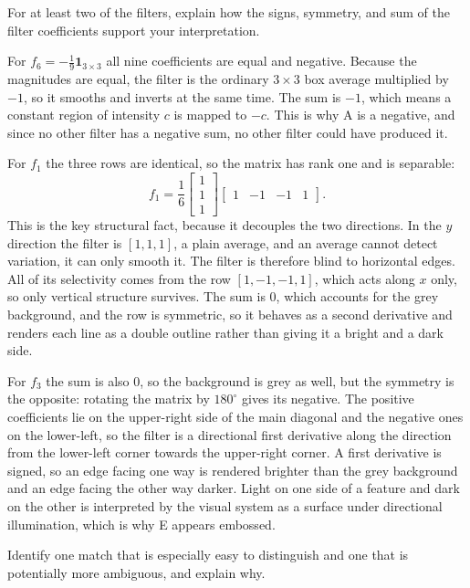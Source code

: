 \documentclass[11pt]{article}
\begin{document}
\begin{question}
For at least two of the filters, explain how the signs, symmetry, and sum of
the filter coefficients support your interpretation.
\end{question}

For $f_6 = -\tfrac{1}{9}\mathbf{1}_{3\times3}$ all nine coefficients are equal
and negative. Because the magnitudes are equal, the filter is the ordinary
$3\times3$ box average multiplied by $-1$, so it smooths and inverts at the
same time. The sum is $-1$, which means a constant region of intensity $c$ is
mapped to $-c$. This is why A is a negative, and since no other filter has a
negative sum, no other filter could have produced it.

For $f_1$ the three rows are identical, so the matrix has rank one and is
separable:
\[
    f_1 = \frac{1}{6}
    \begin{bmatrix} 1 \\ 1 \\ 1 \end{bmatrix}
    \begin{bmatrix} 1 & -1 & -1 & 1 \end{bmatrix} .
\]
This is the key structural fact, because it decouples the two directions. In
the $y$ direction the filter is $[1,1,1]$, a plain average, and an average
cannot detect variation, it can only smooth it. The filter is therefore blind
to horizontal edges. All of its selectivity comes from the row
$[1,-1,-1,1]$, which acts along $x$ only, so only vertical structure survives.
The sum is $0$, which accounts for the grey background, and the row is
symmetric, so it behaves as a second derivative and renders each line as a
double outline rather than giving it a bright and a dark side.

For $f_3$ the sum is also $0$, so the background is grey as well, but the
symmetry is the opposite: rotating the matrix by $180^\circ$ gives its
negative. The positive coefficients lie on the upper-right side of the main
diagonal and the negative ones on the lower-left, so the filter is a
directional first derivative along the direction from the lower-left corner
towards the upper-right corner. A first derivative is signed, so an edge
facing one way is rendered brighter than the grey background and an edge
facing the other way darker. Light on one side of a feature and dark on the
other is interpreted by the visual system as a surface under directional
illumination, which is why E appears embossed.

\begin{question}
Identify one match that is especially easy to distinguish and one that is
potentially more ambiguous, and explain why.
\end{question}
\end{document}
